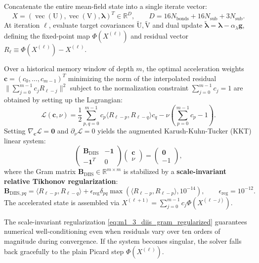 \begin{proposition}
\label{prop:m1_3_diis_solver}
Concatenate the entire mean-field state into a single iterate vector:
\begin{equation}
\label{eq:m1_3_state_vector}
X = (\operatorname{vec}(\mathrm{U}), \operatorname{vec}(\mathrm{V}), \boldsymbol{\lambda})^T \in \mathbb{R}^D, \qquad D = 16 N_{\mathrm{bonds}} + 16 N_{\mathrm{sub}} + 3 N_{\mathrm{sub}}.
\end{equation}
At iteration $\ell$, evaluate target covariances $\tilde{\mathrm{U}}, \tilde{\mathrm{V}}$ and dual update $\tilde{\boldsymbol{\lambda}} = \boldsymbol{\lambda} - \alpha_\lambda \mathbf{g}$, defining the fixed-point map $\Phi(X^{(\ell)})$ and residual vector $R_\ell \equiv \Phi(X^{(\ell)}) - X^{(\ell)}$.

Over a historical memory window of depth $m$, the optimal acceleration weights $\mathbf{c} = (c_0, \dots, c_{m-1})^T$ minimizing the norm of the interpolated residual $\|\sum_{j=0}^{m-1} c_j R_{\ell-j}\|^2$ subject to the normalization constraint $\sum_{j=0}^{m-1} c_j = 1$ are obtained by setting up the Lagrangian:
\begin{equation}
\label{eq:m1_3_diis_lagrangian}
\mathcal{L}(\mathbf{c}, \nu) = \frac{1}{2} \sum_{p, q=0}^{m-1} c_p \langle R_{\ell-p}, R_{\ell-q} \rangle c_q - \nu \left( \sum_{p=0}^{m-1} c_p - 1 \right).
\end{equation}
Setting $\nabla_{\mathbf{c}} \mathcal{L} = \mathbf{0}$ and $\partial_\nu \mathcal{L} = 0$ yields the augmented Karush-Kuhn-Tucker (KKT) linear system:
\begin{equation}
\label{eq:m1_3_diis_kkt}
\begin{pmatrix} \mathbf{B}_{\mathrm{DIIS}} & -\mathbf{1} \\ -\mathbf{1}^T & 0 \end{pmatrix} \begin{pmatrix} \mathbf{c} \\ \nu \end{pmatrix} = \begin{pmatrix} \mathbf{0} \\ -1 \end{pmatrix},
\end{equation}
where the Gram matrix $\mathbf{B}_{\mathrm{DIIS}} \in \mathbb{R}^{m \times m}$ is stabilized by a \textbf{scale-invariant relative Tikhonov regularization}:
\begin{equation}
\label{eq:m1_3_diis_gram_regularized}
\mathbf{B}_{\mathrm{DIIS}, pq} = \langle R_{\ell-p}, R_{\ell-q} \rangle + \epsilon_{\mathrm{reg}} \delta_{pq} \max\left( \langle R_{\ell-p}, R_{\ell-p} \rangle, 10^{-14} \right), \qquad \epsilon_{\mathrm{reg}} = 10^{-12}.
\end{equation}
The accelerated state is assembled via $X^{(\ell+1)} = \sum_{j=0}^{m-1} c_j \Phi(X^{(\ell-j)})$.
\end{proposition}
The scale-invariant regularization \eqref{eq:m1_3_diis_gram_regularized} guarantees numerical well-conditioning even when residuals vary over ten orders of magnitude during convergence. If the system becomes singular, the solver falls back gracefully to the plain Picard step $\Phi(X^{(\ell)})$.



